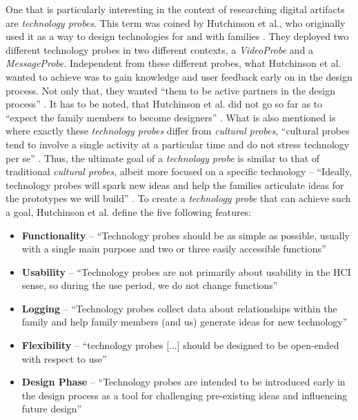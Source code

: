 One that is particularly interesting in the context of researching digital artifacts are \textit{technology probes}. This term was coined by Hutchinson et al., who originally used it as a way to design technologies for and with families \cite{hutchinson2003technology}. They deployed two different technology probes in two different contexts, a \textit{VideoProbe} and a \textit{MessageProbe}. Independent from these different probes, what Hutchinson et al. wanted to achieve was to gain knowledge and user feedback early on in the design process. Not only that, they wanted \enquote{them to be active partners in the design process} \cite[p. 2]{hutchinson2003technology}. It has to be noted, that Hutchinson et al. did not go so far as to \enquote{expect the family members to become designers} \cite[p. 18]{hutchinson2003technology}. What is also mentioned is where exactly these \textit{technology probes} differ from \textit{cultural probes}, \enquote{cultural probes tend to involve a single activity at a particular time and do not stress technology per se} \cite[p. 18]{hutchinson2003technology}. Thus, the ultimate goal of a \textit{technology probe} is similar to that of traditional \textit{cultural probes}, albeit more focused on a specific technology -- \enquote{Ideally, technology probes will spark new ideas and help the families articulate ideas for the prototypes we will build} \cite[p. 18]{hutchinson2003technology}. To create a \textit{technology probe} that can achieve such a goal, Hutchinson et al. define the five following features:

\begin{itemize}
  \item{\textbf{Functionality} -- \enquote{Technology probes should be as simple as possible, usually with a single main purpose and two or three easily accessible functions} \cite[p. 18]{hutchinson2003technology}}
  \item{\textbf{Usability} -- \enquote{Technology probes are not primarily about usability in the HCI sense, so during the use period, we do not change functions} \cite[p. 18]{hutchinson2003technology}}
  \item{\textbf{Logging} -- \enquote{Technology probes collect data about relationships within the family and help family members (and us) generate ideas for new technology} \cite[p. 18]{hutchinson2003technology}}
  \item{\textbf{Flexibility} -- \enquote{technology probes [...] should be designed to be open-ended with respect to use} \cite[p. 19]{hutchinson2003technology}}
  \item{\textbf{Design Phase} -- \enquote{Technology probes are intended to be introduced early in the design process as a tool for challenging pre-existing ideas and influencing future design} \cite[p. 19]{hutchinson2003technology}}
\end{itemize}

